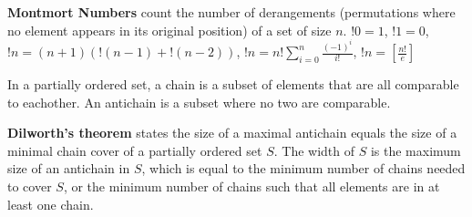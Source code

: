
\textbf{Montmort Numbers} count the number of derangements (permutations where no element appears in its original position) of a set of size $n$. $!0 = 1$, $!1 = 0$, $!n = (n+1)(!(n-1)+!(n-2))$, $!n = n!\sum_{i=0}^{n}\frac{(-1)^i}{i!}$, $!n = [\frac{n!}{e}]$

\hrulefill

In a partially ordered set, a chain is a subset of elements that are all comparable to eachother. An antichain is a subset where no two are comparable.

\vspace{1em}
\textbf{Dilworth's theorem} states the size of a maximal antichain equals the size of a minimal chain cover of a partially ordered set $S$. The width of $S$ is the maximum size of an antichain in $S$, which is equal to the minimum number of chains needed to cover $S$, or the minimum number of chains such that all elements are in at least one chain.
